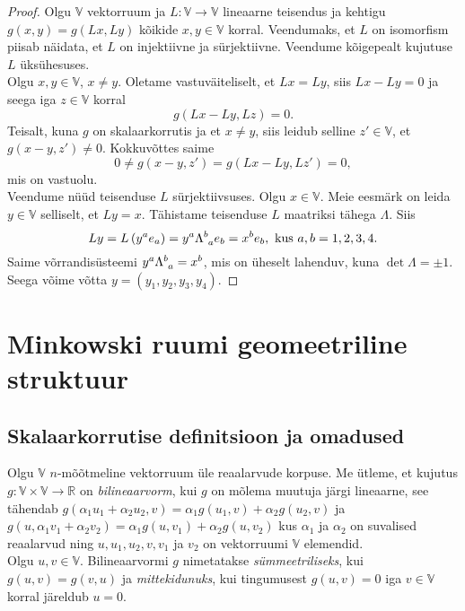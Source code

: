 \documentclass[a4paper,12pt]{article}
\theoremstyle{plain}
\theoremstyle{definition}
\numberwithin{equation}{section}
\begin{document}
\begin{proof}
Olgu $\mathbb{V}$ vektorruum ja $L : \mathbb{V} \rightarrow \mathbb{V}$ lineaarne teisendus ja kehtigu $g \left(x, y\right) = g \left(Lx, Ly\right)$ kõikide $x, y \in \mathbb{V}$ korral. Veendumaks, et $L$ on isomorfism piisab näidata, et $L$ on injektiivne ja sürjektiivne. Veendume kõigepealt kujutuse $L$ üksühesuses.\\
Olgu $x, y \in \mathbb{V}$, $x \neq y$. Oletame vastuväiteliselt, et $Lx = Ly$, siis $Lx - Ly = 0$ ja seega iga $z \in \mathbb{V}$ korral
\begin{equation*}
g \left( Lx - Ly, Lz \right) = 0.
\end{equation*}
Teisalt, kuna $g$ on skalaarkorrutis ja et $x \neq y$, siis leidub selline $z' \in \mathbb{V}$, et $g \left( x - y, z' \right) \neq 0$. Kokkuvõttes saime
\begin{equation*}
0 \neq g \left (x-y,z'\right ) = g\left (Lx - Ly, Lz'\right ) = 0,
\end{equation*}
mis on vastuolu. \\
Veendume nüüd teisenduse $L$ sürjektiivsuses. Olgu $x \in \mathbb{V}$. Meie eesmärk on leida $y \in \mathbb{V}$ selliselt, et $Ly = x$. Tähistame teisenduse $L$ maatriksi tähega $\Lambda$. Siis
\[Ly = L\left(y^a e_a\right) = y^a \Lambda\indices{^b_a}e_b = x^b e_b, \text{ kus } a,b = 1,2,3,4.\]
Saime võrrandisüsteemi $y^a \Lambda\indices{^b_a} = x^b$, mis on üheselt lahenduv, kuna $\det \Lambda = \pm 1$. Seega võime võtta $y = (y_1, y_2, y_3, y_4)$.
\end{proof}

\newpage

\section{Minkowski ruumi geomeetriline struktuur}

\subsection{Skalaarkorrutise definitsioon ja omadused}

Olgu $\mathbb{V}$ $n$-mõõtmeline vektorruum üle reaalarvude korpuse. Me ütleme, et kujutus $g : \mathbb{V} \times \mathbb{V} \rightarrow \mathbb{R}$ on \emph{bilineaarvorm}, kui $g$ on mõlema muutuja järgi lineaarne, see tähendab $g \left( \alpha_1 u_1 + \alpha_2 u_2, v \right) = \alpha_1 g \left( u_1, v \right) + \alpha_2 g \left( u_2, v \right)$ ja $g \left( u, \alpha_1 v_1 + \alpha_2 v_2 \right) = \alpha_1 g \left( u, v_1 \right) + \alpha_2 g \left( u, v_2 \right)$ kus $\alpha_1$ ja $\alpha_2$ on suvalised reaalarvud ning $u, u_1, u_2, v, v_1$ ja $v_2$ on vektorruumi $\mathbb{V}$ elemendid. 
\\
Olgu $u, v \in \mathbb{V}$. Bilineaarvormi $g$ nimetatakse \emph{sümmeetriliseks}, kui $g \left( u, v \right) = g \left(v, u \right)$ ja \emph{mittekidunuks}, kui tingumusest $g \left( u, v \right) = 0$ iga $v \in \mathbb{V}$ korral järeldub  $u = 0$.
\end{document}
